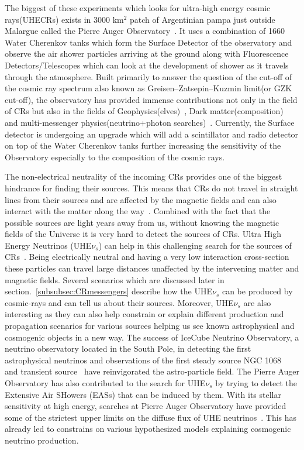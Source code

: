 The biggest of these experiments which looks for ultra-high energy cosmic rays(UHECRs) exists in 3000 km$^2$ patch of Argentinian pampa just outside Malargue called the Pierre Auger Observatory~\cite{Auger:2015}. It uses a combination of 1660 Water Cherenkov tanks which form the Surface Detector of the observatory and observe the air shower particles arriving at the ground along with Fluorescence Detectors/Telescopes which can look at the development of shower as it travels through the atmosphere. Built primarily to answer the question of the cut-off of the cosmic ray spectrum also known as Greisen–Zatsepin–Kuzmin limit(or GZK cut-off), the observatory has provided immense contributions not only in the field of CRs but also in the fields of Geophysics(elves)~\cite{Mussa_2022}, Dark matter(composition)~\cite{Abreu_2023} and multi-messenger physics(neutrino+photon searches)~\cite{Aab_2019_point,Auger_photons_2022}. Currently, the Surface detector is undergoing an upgrade which will add a scintillator and radio detector on top of the Water Cherenkov tanks further increasing the sensitivity of the Observatory especially to the composition of the cosmic rays.

The non-electrical neutrality of the incoming CRs provides one of the biggest hindrance for finding their sources. This means that CRs do not travel in straight lines from their sources and are affected by the magnetic fields and can also interact with the matter along the way~\cite{bister2024largescaleanisotropyfluxdemagnification, ALLARD201233}. Combined with the fact that the possible sources are light years away from us, without knowing the magnetic fields of the Universe it is very hard to detect the sources of CRs. Ultra High Energy Neutrinos (UHE$\nu_s$) can help in this challenging search for the sources of CRs~\cite{UHEcorrelation_2016}. Being electrically neutral and having a very low interaction cross-section these particles can travel large distances unaffected by the intervening matter and magnetic fields. Several scenarios which are discussed later in section.~\ref{subsubsec:CRmessengers} describe how the UHE$\nu_s$ can be produced by cosmic-rays and can tell us about their sources. Moreover, UHE$\nu_s$ are also interesting as they can also help constrain or explain different production and propagation scenarios for various sources helping us see known astrophysical and cosmogenic objects in a new way. The success of IceCube Neutrino Observatory, a neutrino observatory located in the South Pole,  in detecting the first astrophysical neutrinos and observations of the first steady source NGC 1068~\cite{Icecube_2022} and transient source~\cite{Icecube_txs} have reinvigorated the astro-particle field. The Pierre Auger Observatory has also contributed to the search for UHE$\nu_s$ by trying to detect the Extensive Air SHowers (EASs) that can be induced by them. With its stellar sensitivity at high energy, searches at Pierre Auger Observatory have provided some of the strictest upper limits on the diffuse flux of UHE neutrinos~\cite{Aab_2019_diffuse}. This has already led to constrains on various hypothesized models explaining cosmogenic neutrino production.

